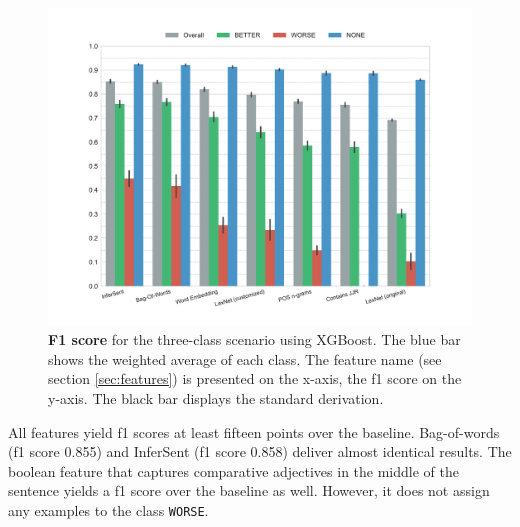 \begin{figure}[h]
      \caption{\textbf{F1 score} for the three-class scenario using XGBoost. The blue bar shows the weighted average of each class. The feature name (see section \ref{sec:features}) is presented on the x-axis, the f1 score on the y-axis. The black bar displays the standard derivation.} 
    \label{fig:3_f1}
 \centering
	\includegraphics[width=1\textwidth]{images/experiments/f1-False}

\end{figure}

All features yield f1 scores at least fifteen points over the baseline. Bag-of-words (f1 score 0.855) and InferSent (f1 score 0.858) deliver almost identical results. The boolean feature that captures comparative adjectives in the middle of the sentence yields a f1 score over the baseline as well. However, it does not assign any examples to the class \texttt{WORSE}.



